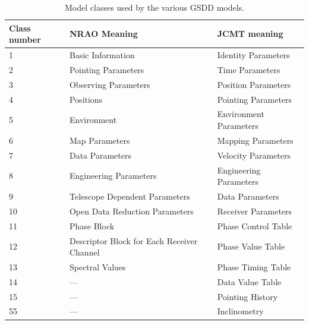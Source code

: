 \documentclass[final,authoryear,5p,times,twocolumn]{elsarticle}
\begin{document}
\begin{table}
\caption{Model classes used by the various GSDD models.}
\label{tab:classes}
\begin{center}
\begin{tabular}{lll}
\hline
Class number & NRAO Meaning & JCMT meaning\\ \hline
1         & Basic Information                                                 &    Identity Parameters        \\
2         & Pointing Parameters                                               &    Time Parameters            \\
3        & Observing Parameters                                               &    Position Parameters        \\
4          & Positions                                                        &    Pointing Parameters        \\
5      & Environment                                                          &    Environment Parameters     \\
6        & Map Parameters                                                     &    Mapping Parameters         \\
7          & Data Parameters                                                  &    Velocity Parameters        \\
8       & Engineering Parameters                                              &    Engineering Parameters   \\
9           & Telescope Dependent Parameters                                  &    Data Parameters            \\
10       & Open Data Reduction Parameters                                     &   Receiver Parameters         \\
11       & Phase Block                                                        &   Phase Control Table         \\
12        & Descriptor Block for Each Receiver Channel                        &   Phase Value Table           \\
13       & Spectral Values                                                    &   Phase Timing Table          \\
14          & ---                                                             &   Data Value Table            \\
15           & ---                                                           &   Pointing History            \\
55                                        & ---                               &   Inclinometry                \\
\hline
\end{tabular}
\end{center}
\end{table}
\end{document}
